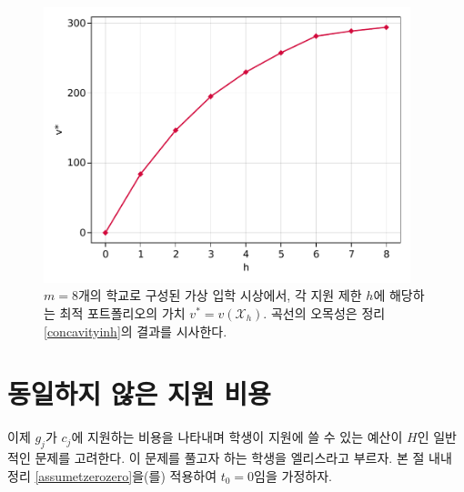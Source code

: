\documentclass[11pt]{article} %
\newif\ifen
\theoremstyle{definition}
\theoremstyle{definition}
\begin{document}
\begin{figure}[h!] 
 \centering
 \includegraphics[width=0.95\textwidth]{./plots/h_v-example.pdf}
  \caption{  \label{planetsplot}
  \ifen Application limit $h$ versus the optimal portfolio valuation $v^* = v(\mathcal{X}_h)$ in a fictional market with $m=8$ schools. The concave shape suggests the result of Theorem \ref{concavityinh}. 
  \else $m=8$개의 학교로 구성된 가상 입학 시상에서, 각 지원 제한 $h$에 해당하는 최적 포트폴리오의 가치 $v^* = v(\mathcal{X}_h)$. 곡선의 오목성은 정리 \ref{concavityinh}의 결과를 시사한다.\fi}
\end{figure}








\ifen \section{Heterogeneous application costs} \else\section{동일하지 않은 지원 비용} \fi\label{hetappcosts}
\ifen
Now we turn to the more general problem in which the constant $g_j$ represents the \emph{cost} of applying to $c_j$ and the student, whom we now call Ellis, has a \emph{budget} of $H$ to spend on college applications.  Applying Theorem \ref{assumetzerozero}, we assume $t_0 = 0$ throughout.
\else
이제 $g_j$가 $c_j$에 지원하는 비용을 나타내며 학생이 지원에 쓸 수 있는 예산이 $H$인 일반적인 문제를 고려한다. 이 문제를 풀고자 하는 학생을 엘리스라고 부르자. 본 절 내내 정리 \ref{assumetzerozero}을(를) 적용하여 $t_0 = 0$임을 가정하자.
\fi
\end{document}
